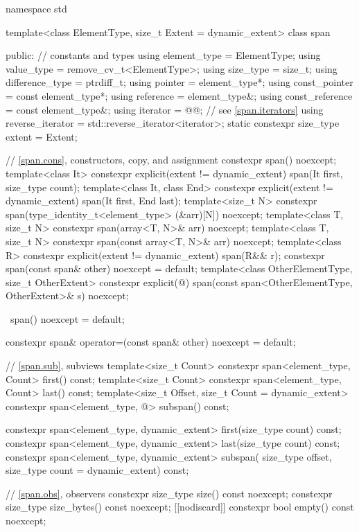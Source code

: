 %
\begin{codeblock}
namespace std {
  template<class ElementType, size_t Extent = dynamic_extent>
  class span {
  public:
    // constants and types
    using element_type = ElementType;
    using value_type = remove_cv_t<ElementType>;
    using size_type = size_t;
    using difference_type = ptrdiff_t;
    using pointer = element_type*;
    using const_pointer = const element_type*;
    using reference = element_type&;
    using const_reference = const element_type&;
    using iterator = @@;        // see \ref{span.iterators}
    using reverse_iterator = std::reverse_iterator<iterator>;
    static constexpr size_type extent = Extent;

    // \ref{span.cons}, constructors, copy, and assignment
    constexpr span() noexcept;
    template<class It>
      constexpr explicit(extent != dynamic_extent) span(It first, size_type count);
    template<class It, class End>
      constexpr explicit(extent != dynamic_extent) span(It first, End last);
    template<size_t N>
      constexpr span(type_identity_t<element_type> (&arr)[N]) noexcept;
    template<class T, size_t N>
      constexpr span(array<T, N>& arr) noexcept;
    template<class T, size_t N>
      constexpr span(const array<T, N>& arr) noexcept;
    template<class R>
      constexpr explicit(extent != dynamic_extent) span(R&& r);
    constexpr span(const span& other) noexcept = default;
    template<class OtherElementType, size_t OtherExtent>
      constexpr explicit(@\seebelow@) span(const span<OtherElementType, OtherExtent>& s) noexcept;

    ~span() noexcept = default;

    constexpr span& operator=(const span& other) noexcept = default;

    // \ref{span.sub}, subviews
    template<size_t Count>
      constexpr span<element_type, Count> first() const;
    template<size_t Count>
      constexpr span<element_type, Count> last() const;
    template<size_t Offset, size_t Count = dynamic_extent>
      constexpr span<element_type, @\seebelow@> subspan() const;

    constexpr span<element_type, dynamic_extent> first(size_type count) const;
    constexpr span<element_type, dynamic_extent> last(size_type count) const;
    constexpr span<element_type, dynamic_extent> subspan(
      size_type offset, size_type count = dynamic_extent) const;

    // \ref{span.obs}, observers
    constexpr size_type size() const noexcept;
    constexpr size_type size_bytes() const noexcept;
    [[nodiscard]] constexpr bool empty() const noexcept;

}}
\end{codeblock}
